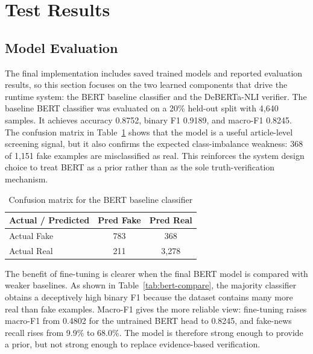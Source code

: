 \documentclass[11pt]{article}
\begin{document}
\section{Test Results}

\subsection{Model Evaluation}

The final implementation includes saved trained models and reported evaluation
results, so this section focuses on the two learned components that drive the
runtime system: the BERT baseline classifier and the DeBERTa-NLI verifier. The
baseline BERT classifier was evaluated on a 20\% held-out split with 4,640
samples. It achieves accuracy 0.8752, binary F1 0.9189, and macro-F1 0.8245.
The confusion matrix in Table~\ref{tab:bert-confusion} shows that the model is
a useful article-level screening signal, but it also confirms the expected
class-imbalance weakness: 368 of 1,151 fake examples are misclassified as real.
This reinforces the system design choice to treat BERT as a prior rather than
as the sole truth-verification mechanism.

\begin{table}[H]
    \centering
    \caption{Confusion matrix for the BERT baseline classifier}
    \label{tab:bert-confusion}
    \begin{tabular}{@{}lcc@{}}
        \toprule
        \textbf{Actual / Predicted} & \textbf{Pred Fake} & \textbf{Pred Real} \\
        \midrule
        Actual Fake & 783 & 368 \\
        Actual Real & 211 & 3,278 \\
        \bottomrule
    \end{tabular}
\end{table}

The benefit of fine-tuning is clearer when the final BERT model is compared
with weaker baselines. As shown in Table~\ref{tab:bert-compare}, the majority
classifier obtains a deceptively high binary F1 because the dataset contains
many more real than fake examples. Macro-F1 gives the more reliable view:
fine-tuning raises macro-F1 from 0.4802 for the untrained BERT head to 0.8245,
and fake-news recall rises from 9.9\% to 68.0\%. The model is therefore strong
enough to provide a prior, but not strong enough to replace evidence-based
verification.
\end{document}
